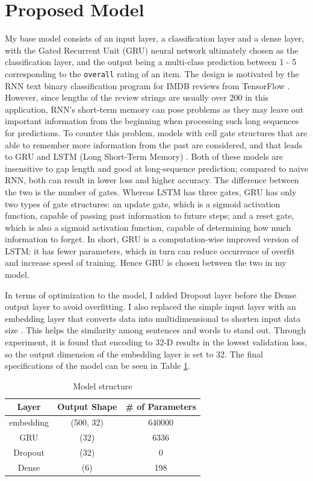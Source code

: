 \documentclass[12pt]{article}
\begin{document}
\section{Proposed Model}
\vspace{-0.3cm}
My base model consists of an input layer, a classification layer and a dense layer, with the Gated Recurrent Unit (GRU) neural network ultimately chosen as the classification layer, and the output being a multi-class prediction between 1 - 5 corresponding to the \texttt{overall} rating of an item. The design is motivated by the RNN text binary classification program for IMDB reviews from TensorFlow \cite{Textclassification}. However, since lengths of the review strings are usually over 200 in this application, RNN’s short-term memory can pose problems as they may leave out important information from the beginning when processing such long sequences for predictions. To counter this problem, models with cell gate structures that are able to remember more information from the past are considered, and that leads to GRU and LSTM (Long Short-Term Memory) \cite{gru}. Both of these models are insensitive to gap length and good at long-sequence prediction; compared to naive RNN, both can result in lower loss and higher accuracy. The difference between the two is the number of gates. Whereas LSTM has three gates, GRU has only two types of gate structures: an update gate, which is a sigmoid activation function, capable of passing past information to future steps; and a reset gate, which is also a sigmoid activation function, capable of determining how much information to forget. In short, GRU is a computation-wise improved version of LSTM: it has fewer parameters, which in turn can reduce occurrence of overfit and increase speed of training. Hence GRU is chosen between the two in my model.

In terms of optimization to the model, I added Dropout layer before the Dense output layer to avoid overfitting. I also replaced the simple input layer with an embedding layer that converts data into multidimensional to shorten input data size \cite{emd}. This helps the similarity among sentences and words to stand out. Through experiment, it is found that encoding to 32-D results in the lowest validation loss, so the output dimension of the embedding layer is set to 32. The final specifications of the model can be seen in Table \ref{table:ms}.
\begin{table}[h!]
    \small
    \centering
        \begin{tabular}{|c|c|c|}
        \hline
        Layer & Output Shape & \# of Parameters \\
        \hline 
        embedding & (500, 32) & 640000 \\
        \hline
        GRU &                   (32) &               6336 \\
        \hline
        Dropout &                   (32) &               0 \\
        \hline
        Dense  &               (6)     &            198  \\
        \hline
        \end{tabular}
    \caption{Model structure}
    \label{table:ms}
    \vspace{-0.7cm}
\end{table}
\end{document}
